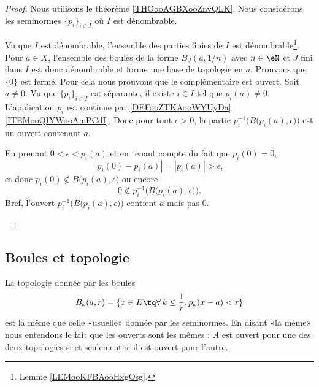 \begin{proof}
	Nous utilisons le théorème \ref{THOooAGBXooZnvQLK}. Nous considérons les seminormes \( \{ p_i \}_{i\in I}\) où \( I\) est dénombrable.
	\begin{subproof}
		Vu que \( I\) est dénombrable, l'ensemble des parties finies de \( I\) est dénombrable\footnote{Lemme \ref{LEMooKFBAooHxgOsg}.}. Pour \( a\in X\), l'ensemble des boules de la forme \( B_J(a,1/n)\) avec \( n\in \eN\) et \( J\) fini dans \( I\) est donc dénombrable et forme une base de topologie en \( a\).
		Prouvons que \( \{ 0 \}\) est fermé. Pour cela nous prouvons que le complémentaire est ouvert. Soit \( a\neq 0\). Vu que \( \{ p_i \}_{i\in I}\) est séparante, il existe \( i\in I\) tel que \( p_i(a)\neq 0\). L'application \( p_i\) est continue par \ref{DEFooZTKAooWYUyDa}\ref{ITEMooQIYWooAmPCdI}. Donc pour tout \( \epsilon>0\), la partie \( p_i^{-1}\Big(  B\big( p_i(a),\epsilon \big)  \Big)\) est un ouvert contenant \( a\).

		En prenant \( 0<\epsilon<p_i(a)\) et en tenant compte du fait que \( p_i(0)=0 \),
		\begin{equation}
			| p_i(0)-p_i(a) |=| p_i(a) |>\epsilon,
		\end{equation}
		et donc \( p_i(0)\not\in B\big( p_i(a),\epsilon \big)\) ou encore
		\begin{equation}
			0\not\in p_i^{-1}\Big( B\big( p_i(a),\epsilon \big) \Big).
		\end{equation}
		Bref, l'ouvert \( p_i^{-1}\Big(  B\big( p_i(a),\epsilon \big)  \Big)\) contient \( a\) mais pas \( 0\).
	\end{subproof}
\end{proof}


\subsection{Boules et topologie}

\begin{proposition} \label{PropLOwUvCO}
	La topologie donnée par les boules
	\begin{equation}    \label{EqGHfYIlQ}
		B_k(a,r)=\{ x\in E\tq \forall\,k\leq \frac{1}{ r },p_k(x-a)<r\}
	\end{equation}
	est la même que celle «usuelle» donnée par les seminormes. En disant «la même» nous entendons le fait que les ouverts sont les mêmes : \( A\) est ouvert pour une des deux topologies si et seulement si il est ouvert pour l'autre.
\end{proposition}

